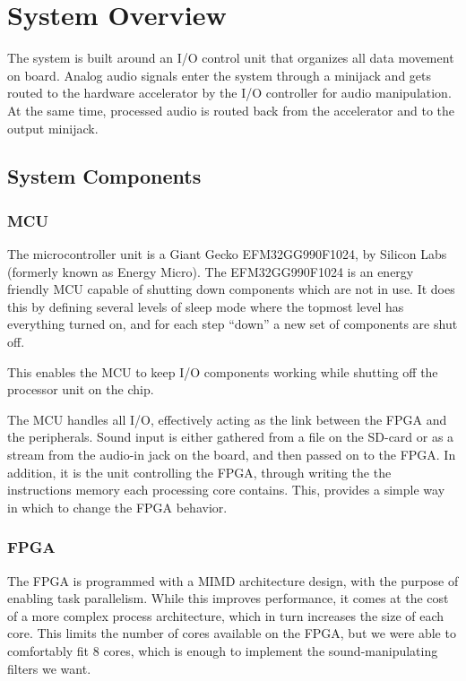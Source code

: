 \section{System Overview}

The system is built around an I/O control unit that organizes all data movement
on board. Analog audio signals enter the system through a minijack and gets
routed to the hardware accelerator by the I/O controller for audio manipulation.
At the same time, processed audio is routed back from the accelerator and to the
output minijack.

\subsection{System Components}
\subsubsection{MCU}\label{intro:system-components-mcu}
The microcontroller unit is a Giant Gecko EFM32GG990F1024, by Silicon Labs
(formerly known as Energy Micro). The EFM32GG990F1024 is an energy friendly MCU
capable of shutting down components which are not in use. It does this by
defining several levels of sleep mode where the topmost level has everything
turned on, and for each step ``down'' a new set of components are shut off.

This enables the MCU to keep I/O components working while shutting off the
processor unit on the chip.

The MCU handles all I/O, effectively acting as the link between the FPGA and the
peripherals. Sound input is either gathered from a file on the SD-card or as a
stream from the audio-in jack on the board, and then passed on to the FPGA. In
addition, it is the unit controlling the FPGA, through writing the the
instructions memory each processing core contains. This, provides a simple way
in which to change the FPGA behavior.

\subsubsection{FPGA}
The FPGA is programmed with a MIMD architecture design, with the purpose of
enabling task parallelism. While this improves performance, it comes at the cost
of a more complex process architecture, which in turn increases the size of each
core. This limits the number of cores available on the FPGA, but we were able to
comfortably fit 8 cores, which is enough to implement the sound-manipulating
filters we want.

